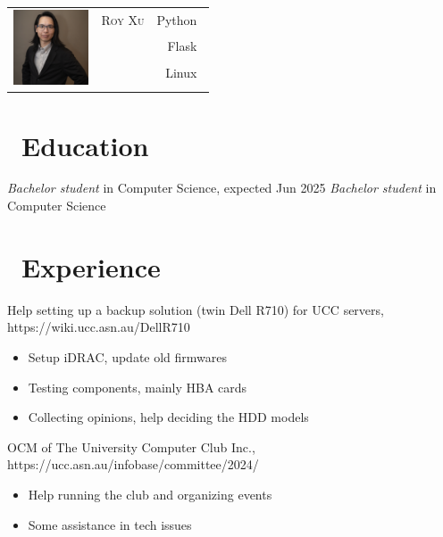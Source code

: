 \documentclass{resume}
\begin{document}

{
\Large{
  \begin{tabu}{ c l r }
    & \scshape{Roy Xu} & {Python~} \\
    &  & {Flask~} \\
    &  & {Linux~} \\
    & 
  \end{tabu}
}
}

\section{\faGraduationCap\ Education}
\textit{Bachelor student} in Computer Science, expected Jun 2025
\textit{Bachelor student} in Computer Science

\section{\faUsers\ Experience}
Help setting up a backup solution (twin Dell R710) for UCC servers, https://wiki.ucc.asn.au/DellR710
\begin{itemize}
  \item Setup iDRAC, update old firmwares
  \item Testing components, mainly HBA cards
  \item Collecting opinions, help deciding the HDD models
\end{itemize}


OCM of The University Computer Club Inc., https://ucc.asn.au/infobase/committee/2024/
\begin{itemize}
  \item Help running the club and organizing events
  \item Some assistance in tech issues
\end{itemize}
\end{document}
